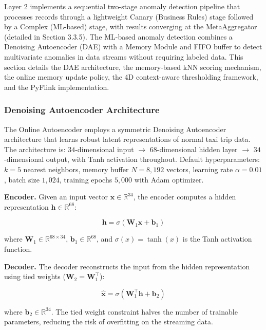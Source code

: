 Layer 2 implements a sequential two-stage anomaly detection pipeline that processes records through a lightweight Canary (Business Rules) stage followed by a Complex (ML-based) stage, with results converging at the MetaAggregator (detailed in Section 3.3.5). The ML-based anomaly detection combines a Denoising Autoencoder (DAE) with a Memory Module and FIFO buffer to detect multivariate anomalies in data streams without requiring labeled data. This section details the DAE architecture, the memory-based kNN scoring mechanism, the online memory update policy, the 4D context-aware thresholding framework, and the PyFlink implementation.

\subsubsection{Denoising Autoencoder Architecture}

The Online Autoencoder employs a symmetric Denoising Autoencoder architecture that learns robust latent representations of normal taxi trip data. The architecture is: $34$-dimensional input $\rightarrow$ $68$-dimensional hidden layer $\rightarrow$ $34$-dimensional output, with Tanh activation throughout. Default hyperparameters: $k=5$ nearest neighbors, memory buffer $N=8{,}192$ vectors, learning rate $\alpha=0.01$, batch size $1{,}024$, training epochs $5{,}000$ with Adam optimizer.

\textbf{Encoder.} Given an input vector $\mathbf{x} \in \mathbb{R}^{34}$, the encoder computes a hidden representation $\mathbf{h} \in \mathbb{R}^{68}$:

\begin{equation}
\mathbf{h} = \sigma(\mathbf{W}_1 \mathbf{x} + \mathbf{b}_1)
\label{eq:encoder}
\end{equation}

where $\mathbf{W}_1 \in \mathbb{R}^{68 \times 34}$, $\mathbf{b}_1 \in \mathbb{R}^{68}$, and $\sigma(x) = \tanh(x)$ is the Tanh activation function.

\textbf{Decoder.} The decoder reconstructs the input from the hidden representation using tied weights ($\mathbf{W}_2 = \mathbf{W}_1^\top$):

\begin{equation}
\hat{\mathbf{x}} = \sigma(\mathbf{W}_1^\top \mathbf{h} + \mathbf{b}_2)
\label{eq:decoder}
\end{equation}

where $\mathbf{b}_2 \in \mathbb{R}^{34}$. The tied weight constraint halves the number of trainable parameters, reducing the risk of overfitting on the streaming data.

